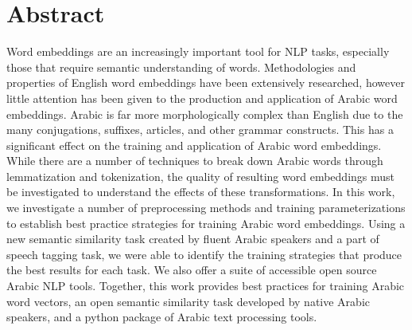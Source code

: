 \section*{Abstract}

Word embeddings are an increasingly important tool for NLP tasks, especially those that require semantic understanding of words. Methodologies and properties of English word embeddings have been extensively researched, however little attention has been given to the production and application of Arabic word embeddings. Arabic is far more morphologically complex than English due to the many conjugations, suffixes, articles, and other grammar constructs. This has a significant effect on the training and application of Arabic word embeddings. While there are a number of techniques to break down Arabic words through lemmatization and tokenization, the quality of resulting word embeddings must be investigated to understand the effects of these transformations. In this work, we investigate a number of preprocessing methods and training parameterizations to establish best practice strategies for training Arabic word embeddings. Using a new semantic similarity task created by fluent Arabic speakers and a part of speech tagging task, we were able to identify the training strategies that produce the best results for each task. We also offer a suite of accessible open source Arabic NLP tools. Together, this work provides best practices for training Arabic word vectors, an open semantic similarity task developed by native Arabic speakers, and a python package of Arabic text processing tools.